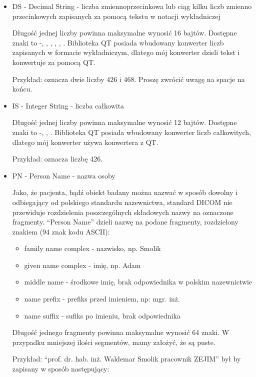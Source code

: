 \begin{itemize}
    \item DS - Decimal String - liczba zmiennoprzecinkowa lub ciąg kilku liczb zmienno przecinkowych zapisanych za pomocą tekstu w notacji wykładniczej

    Długość jednej liczby powinna maksymalne wynosić 16 bajtów.
    Dostępne znaki to -, \dataword{+}, \dataword{-}, , , .
    Biblioteka QT posiada wbudowany konwerter liczb zapisanych w formacie wykładniczym, dlatego mój konwerter dzieli tekst i konwertuje za pomocą QT.
    
    Przykład:  oznacza dwie liczby 426 i 468. Proszę zwrócić uwagę na spacje na końcu.

    \item IS - Integer String - liczba całkowita 

    Długość jednej liczby powinna maksymalne wynosić 12 bajtów.
    Dostępne znaki to -, \dataword{+}, \dataword{-}.
    Biblioteka QT posiada wbudowany konwerter liczb całkowitych, dlatego mój konwerter używa konwertera z QT.
    
    Przykład:   oznacza liczbę 426.

    \item PN - Person Name - nazwa osoby

    Jako, że pacjenta, bądź obiekt badany można nazwać w sposób dowolny i odbiegający od polskiego standardu nazewnictwa, standard DICOM nie przewiduje rozdzielenia poszczególnych składowych nazwy na oznaczone fragmenty.
    \enquote{Person Name} dzieli nazwę na podane fragmenty, rozdzielony znakiem \dataword{\^{}} (94 znak kodu ASCII):
    \begin{itemize}
        \item family name complex - nazwisko, np. Smolik
        \item given name complex - imię, np. Adam
        \item middle name - środkowe imię, brak odpowiednika w polskim nazewnictwie
        \item name prefix - prefiks przed imieniem, np: mgr. inż.
        \item name suffix - sufiks po imieniu, brak odpowiednika
    \end{itemize}
    Długość jednego fragmenty powinna maksymalne wynosić 64 znaki.
    W przypadku mniejszej ilości segmentów, mamy założyć, że są puste.
    
    Przykład: \enquote{prof. dr. hab. inż. Waldemar Smolik pracownik ZEJIM} był by zapisany w sposób następujący: 


\end{itemize}
